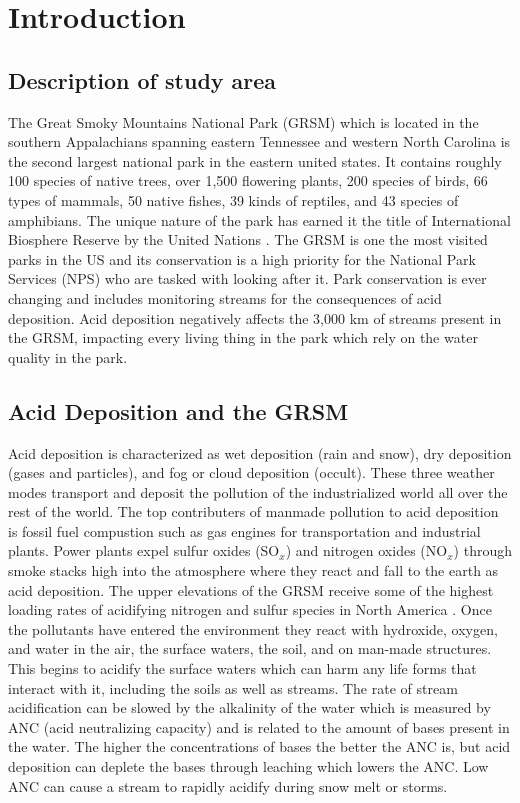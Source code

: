 \chapter{Introduction} \label{ch:intro}

\section{Description of study area}

The Great Smoky Mountains National Park (GRSM) which is located in the southern Appalachians spanning eastern Tennessee and western North Carolina is the second largest national park in the eastern united states.
It contains roughly 100 species of native trees, over 1,500 flowering plants, 200 species of birds, 66 types of mammals, 50 native fishes, 39 kinds of reptiles, and 43 species of amphibians.
The unique nature of the park has earned it the title of  International Biosphere Reserve by the United Nations \citep{NPS}.	
The GRSM is one the most visited parks in the US and its conservation is a high priority for the National Park Services (NPS) who are tasked with looking after it.		
Park conservation is ever changing and  includes monitoring streams for the consequences of acid deposition.	
Acid deposition negatively affects the 3,000 km of streams present in the GRSM, impacting every living thing in the park which rely on the water quality in the park.  
	
\section{Acid Deposition and the GRSM}

Acid deposition is characterized as wet deposition (rain and snow), dry deposition (gases and particles), and fog or cloud deposition (occult).
These three weather modes transport and deposit the pollution of the industrialized world all over the rest of the world.
The top contributers of  manmade pollution to acid deposition is fossil fuel compustion such as gas engines for transportation and industrial plants.%
Power plants expel sulfur oxides (SO$_x$) and nitrogen oxides (NO$_x$) through smoke stacks high into the atmosphere where they react and fall to the earth as acid deposition.
The upper elevations of the GRSM receive some of the highest loading rates of acidifying nitrogen and sulfur species in North America \citep{johnson1992atmospheric}.  
Once the pollutants have entered the environment they react with hydroxide, oxygen, and water in the air, the surface waters, the soil, and on man-made structures\citep{board1983acid}.  
This begins to acidify the surface waters which can harm any life forms that interact with it, including the soils as well as streams.
The rate of stream acidification can be slowed by the alkalinity of the water which is measured by ANC (acid neutralizing capacity) and is related to the amount of bases present in the water.
The higher the concentrations of bases the better the ANC is, but acid deposition can deplete the bases through leaching which lowers the ANC.
Low ANC can cause a stream to rapidly acidify during snow melt or storms.


